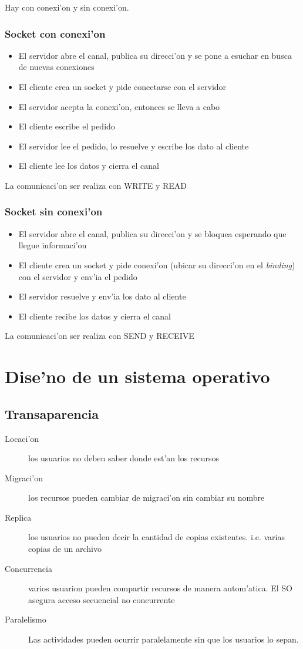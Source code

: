 \documentclass[a4paper,spanish]{article}
\begin{document}
Hay con conexi'on y sin conexi'on.
\subsubsection{Socket con conexi'on}
\begin{itemize}
	\item El servidor abre el canal, publica su direcci'on y se pone a
esuchar en busca de nuevas conexiones
	\item El cliente crea un socket y pide conectarse con el servidor
	\item El servidor acepta la conexi'on, entonces se lleva a cabo
	\item El cliente escribe el pedido
	\item El servidor lee el pedido, lo resuelve y escribe los dato al
cliente
	\item El cliente lee los datos y cierra el canal
\end{itemize}
La comunicaci'on ser realiza con WRITE y READ

\subsubsection{Socket sin conexi'on}
\begin{itemize}
	\item El servidor abre el canal, publica su direcci'on y se bloquea
esperando que llegue informaci'on
	\item El cliente crea un socket y pide conexi'on (ubicar su direcci'on
en el \emph{binding})  con el servidor y env'ia el pedido
	\item El servidor resuelve y env'ia los dato al cliente
	\item El cliente recibe los datos y cierra el canal
\end{itemize}
La comunicaci'on ser realiza con SEND y RECEIVE


\section{Dise'no de un sistema operativo}
\subsection{Transaparencia}
\begin{description}
	\item[Locaci'on] los usuarios no deben saber donde est'an los recursos
	\item[Migraci'on] los recursos pueden cambiar de migraci'on sin cambiar su nombre
	\item[Replica] los usuarios no pueden decir la cantidad de copias existentes. i.e. varias copias de un archivo
	\item[Concurrencia] varios usuarion pueden compartir recursos de manera autom'atica. El SO asegura acceso secuencial no concurrente
	\item[Paralelismo] Las actividades pueden ocurrir paralelamente sin que los usuarios lo sepan.
\end{description}
\end{document}
